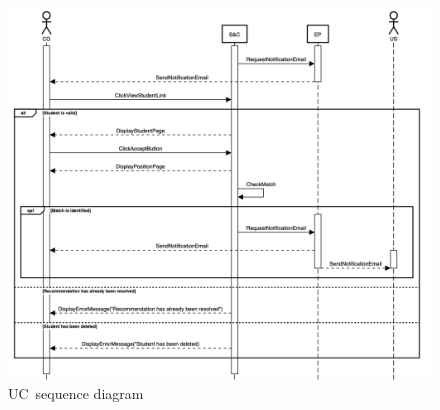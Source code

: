 \begin{figure}
    \centering
    \includegraphics[width=16cm]{images/sequence-diagrams/company-accepts-recommendation.png}
    \caption{UC\theuc\ sequence diagram}
\end{figure}


